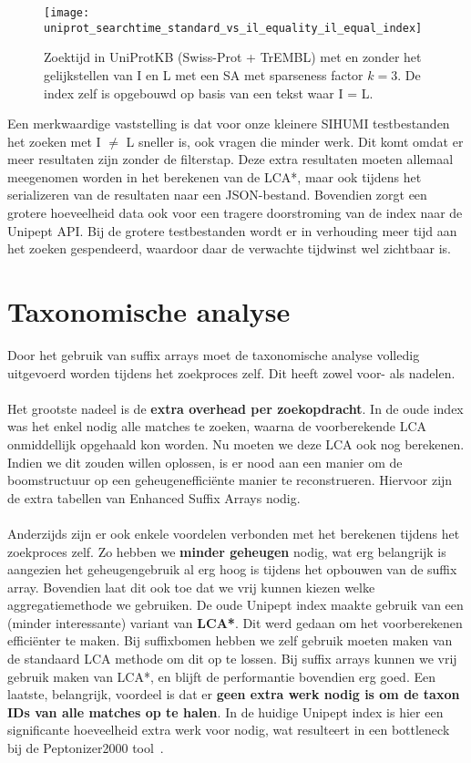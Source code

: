 \begin{figure}[ht]
    \centering
    \texttt{[image: uniprot\_searchtime\_standard\_vs\_il\_equality\_il\_equal\_index]}
    \caption{Zoektijd in UniProtKB (Swiss-Prot + TrEMBL) met en zonder het gelijkstellen van I en L met een SA met sparseness factor $k = 3$. De index zelf is opgebouwd op basis van een tekst waar I = L.}
    \label{fig:uniprot_search_il_equal}
\end{figure}

Een merkwaardige vaststelling is dat voor onze kleinere SIHUMI testbestanden het zoeken met I $\neq$ L sneller is, ook vragen die minder werk.
Dit komt omdat er meer resultaten zijn zonder de filterstap.
Deze extra resultaten moeten allemaal meegenomen worden in het berekenen van de LCA*, maar ook tijdens het serializeren van de resultaten naar een JSON-bestand.
Bovendien zorgt een grotere hoeveelheid data ook voor een tragere doorstroming van de index naar de Unipept API\@.
Bij de grotere testbestanden wordt er in verhouding meer tijd aan het zoeken gespendeerd, waardoor daar de verwachte tijdwinst wel zichtbaar is.

\section{Taxonomische analyse}\label{sec:taxonomische-analyse}
Door het gebruik van suffix arrays moet de taxonomische analyse volledig uitgevoerd worden tijdens het zoekproces zelf.
Dit heeft zowel voor- als nadelen.
\\ \\
Het grootste nadeel is de \textbf{extra overhead per zoekopdracht}.
In de oude index was het enkel nodig alle matches te zoeken, waarna de voorberekende LCA onmiddellijk opgehaald kon worden.
Nu moeten we deze LCA ook nog berekenen.
Indien we dit zouden willen oplossen, is er nood aan een manier om de boomstructuur op een geheugenefficiënte manier te reconstrueren.
Hiervoor zijn de extra tabellen van Enhanced Suffix Arrays nodig.
\\ \\
Anderzijds zijn er ook enkele voordelen verbonden met het berekenen tijdens het zoekproces zelf.
Zo hebben we \textbf{minder geheugen} nodig, wat erg belangrijk is aangezien het geheugengebruik al erg hoog is tijdens het opbouwen van de suffix array.
Bovendien laat dit ook toe dat we vrij kunnen kiezen welke aggregatiemethode we gebruiken.
De oude Unipept index maakte gebruik van een (minder interessante) variant van \textbf{LCA*}.
Dit werd gedaan om het voorberekenen efficiënter te maken.
Bij suffixbomen hebben we zelf gebruik moeten maken van de standaard LCA methode om dit op te lossen.
Bij suffix arrays kunnen we vrij gebruik maken van LCA*, en blijft de performantie bovendien erg goed.
Een laatste, belangrijk, voordeel is dat er \textbf{geen extra werk nodig is om de taxon IDs van alle matches op te halen}.
In de huidige Unipept index is hier een significante hoeveelheid extra werk voor nodig, wat resulteert in een bottleneck bij de Peptonizer2000 tool~\cite{pep_gm}.


